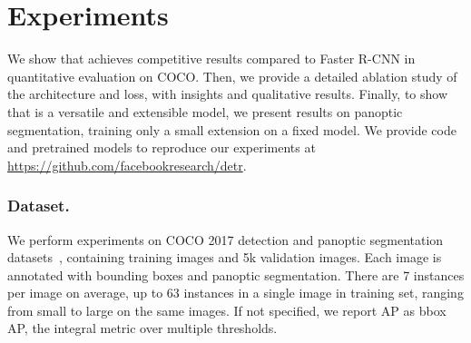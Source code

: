 
\section{Experiments}
\label{sec:experiments}



We show that \detr achieves competitive results compared to Faster R-CNN
in quantitative evaluation on COCO.
Then, we provide a detailed ablation study of the architecture and loss,
with insights and qualitative results.
Finally, to show that \detr is a versatile and extensible model,
we present results on panoptic segmentation, training only a small
extension on a fixed \detr model.
We provide code and pretrained models to reproduce our experiments at
\url{https://github.com/facebookresearch/detr}.
\subsubsection{Dataset.}
We perform experiments on COCO 2017 detection and panoptic segmentation datasets~\cite{Lin2014coco,panoptic_kirillov2019fpn},
containing  training images and 5k validation images.
Each image is annotated with bounding boxes and panoptic segmentation.
There are 7 instances per image on average, up to 63 instances in a single image
in training set, ranging from small to large on the same images. 
If not specified, we report AP as bbox AP, the integral metric over multiple thresholds.
